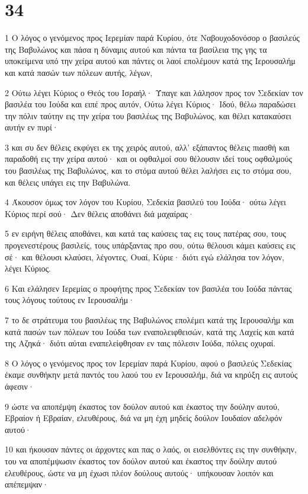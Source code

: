 \chapter{34}

\par 1 Ο λόγος ο γενόμενος προς Ιερεμίαν παρά Κυρίου, ότε Ναβουχοδονόσορ ο βασιλεύς της Βαβυλώνος και πάσα η δύναμις αυτού και πάντα τα βασίλεια της γης τα υποκείμενα υπό την χείρα αυτού και πάντες οι λαοί επολέμουν κατά της Ιερουσαλήμ και κατά πασών των πόλεων αυτής, λέγων,
\par 2 Ούτω λέγει Κύριος ο Θεός του Ισραήλ· Ύπαγε και λάλησον προς τον Σεδεκίαν τον βασιλέα του Ιούδα και ειπέ προς αυτόν, Ούτω λέγει Κύριος· Ιδού, θέλω παραδώσει την πόλιν ταύτην εις την χείρα του βασιλέως της Βαβυλώνος, και θέλει κατακαύσει αυτήν εν πυρί·
\par 3 και συ δεν θέλεις εκφύγει εκ της χειρός αυτού, αλλ' εξάπαντος θέλεις πιασθή και παραδοθή εις την χείρα αυτού· και οι οφθαλμοί σου θέλουσιν ιδεί τους οφθαλμούς του βασιλέως της Βαβυλώνος, και το στόμα αυτού θέλει λαλήσει εις το στόμα σου, και θέλεις υπάγει εις την Βαβυλώνα.
\par 4 Άκουσον όμως τον λόγον του Κυρίου, Σεδεκία βασιλεύ του Ιούδα· ούτω λέγει Κύριος περί σού· Δεν θέλεις αποθάνει διά μαχαίρας·
\par 5 εν ειρήνη θέλεις αποθάνει, και κατά τας καύσεις τας εις τους πατέρας σου, τους προγενεστέρους βασιλείς, τους υπάρξαντας προ σου, ούτω θέλουσι κάμει καύσεις εις σέ· και θέλουσι κλαύσει, λέγοντες, Ουαί, Κύριε· διότι εγώ ελάλησα τον λόγον, λέγει Κύριος.
\par 6 Και ελάλησεν Ιερεμίας ο προφήτης προς Σεδεκίαν τον βασιλέα του Ιούδα πάντας τους λόγους τούτους εν Ιερουσαλήμ·
\par 7 το δε στράτευμα του βασιλέως της Βαβυλώνος επολέμει κατά της Ιερουσαλήμ και κατά πασών των πόλεων του Ιούδα των εναπολειφθεισών, κατά της Λαχείς και κατά της Αζηκά· διότι αύται εναπελείφθησαν εν ταις πόλεσιν Ιούδα, πόλεις οχυραί.
\par 8 Ο λόγος ο γενόμενος προς τον Ιερεμίαν παρά Κυρίου, αφού ο βασιλεύς Σεδεκίας έκαμε συνθήκην μετά παντός του λαού του εν Ιερουσαλήμ, διά να κηρύξη εις αυτούς άφεσιν·
\par 9 ώστε να αποπέμψη έκαστος τον δούλον αυτού και έκαστος την δούλην αυτού, Εβραίον ή Εβραίαν, ελευθέρους, διά να μη έχη μηδείς δούλον Ιουδαίον αδελφόν αυτού·
\par 10 και ήκουσαν πάντες οι άρχοντες και πας ο λαός, οι εισελθόντες εις την συνθήκην, του να αποπέμψωσιν έκαστος τον δούλον αυτού και έκαστος την δούλην αυτού ελευθέρους, ώστε να μη έχωσι πλέον δούλους αυτούς· υπήκουσαν λοιπόν και απέπεμψαν·
